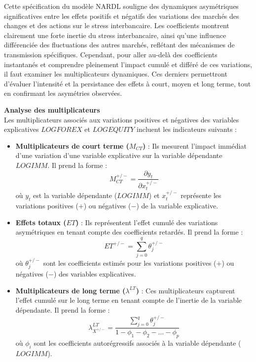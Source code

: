 Cette spécification du modèle NARDL souligne des dynamiques asymétriques significatives entre les effets positifs et négatifs des variations des marchés des changes et des actions sur le stress interbancaire. Les coefficients montrent clairement une forte inertie du stress interbancaire, ainsi qu'une influence différenciée des fluctuations des autres marchés, reflétant des mécanismes de transmission spécifiques. Cependant, pour aller au-delà des coefficients instantanés et comprendre pleinement l’impact cumulé et différé de ces variations, il  faut examiner les multiplicateurs dynamiques. Ces derniers permettront d’évaluer l’intensité et la persistance des effets à court, moyen et long terme, tout en confirmant les asymétries observées.

\vspace{0.5cm}

\textbf{Analyse des multiplicateurs} \\

Les multiplicateurs associés aux variations positives et négatives des variables explicatives \(LOGFOREX\) et \(LOGEQUITY\) incluent les indicateurs suivants :

\begin{itemize}
    \item \textbf{Multiplicateurs de court terme (\(M_{CT}\))} : Ils mesurent l’impact immédiat d’une variation d’une variable explicative sur la variable dépendante \(LOGIMM\). Il prend la forme : 
        \[
        M_{CT}^{+/-} = \frac{\partial y_t}{\partial x_t^{+/-}}
        \]
        où \(y_t\) est la variable dépendante (\(LOGIMM\)) et \(x_t^{+/-}\) représente les variations positives (\(+\)) ou négatives (\(-\)) de la variable explicative.

    \item \textbf{Effets totaux (\(ET\))} : Ils représentent l’effet cumulé des variations asymétriques en tenant compte des coefficients retardés. Il prend la forme : 
        \[
        ET^{+/-} = \sum_{j=0}^q \theta_j^{+/-}
        \]
        où \(\theta_j^{+/-}\) sont les coefficients estimés pour les variations positives (\(+\)) ou négatives (\(-\)) des variables explicatives.

    \item \textbf{Multiplicateurs de long terme (\(\lambda^{LT}\))} : Ces multiplicateurs capturent l’effet cumulé sur le long terme en tenant compte de l’inertie de la variable dépendante. Il prend la forme : 
        \[
        \lambda^{LT}_{X^{+/-}} = \frac{\sum_{j=0}^q \theta_j^{+/-}}{1 - \phi_1 - \phi_2 - \dots - \phi_p}
        \]
        où \(\phi_i\) sont les coefficients autorégressifs associés à la variable dépendante (\(LOGIMM\)).
\end{itemize}

